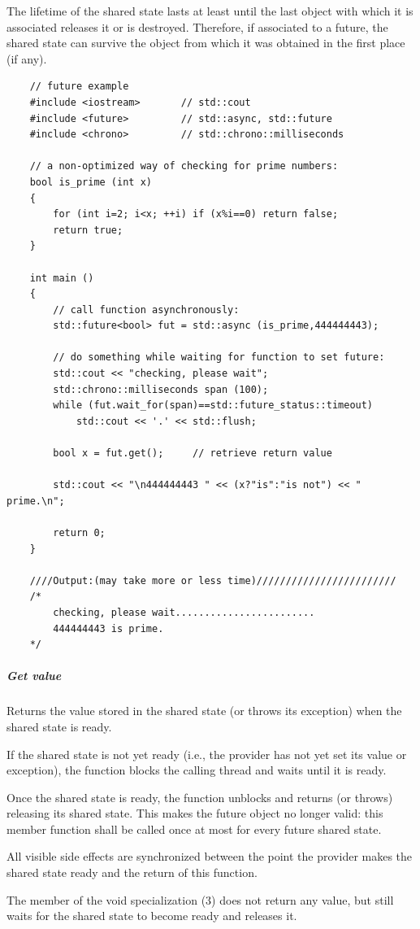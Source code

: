 \documentclass[UTF8,a4paper,12pt]{ctexbook}
\begin{document}
			The lifetime of the shared state lasts at least until the last object with which it is associated releases it or is destroyed. Therefore, if associated to a future, the shared state can survive the object from which it was obtained in the first place (if any).
\begin{lstlisting}
	// future example
	#include <iostream>       // std::cout
	#include <future>         // std::async, std::future
	#include <chrono>         // std::chrono::milliseconds
	
	// a non-optimized way of checking for prime numbers:
	bool is_prime (int x) 
	{
		for (int i=2; i<x; ++i) if (x%i==0) return false;
		return true;
	}
	
	int main ()
	{
		// call function asynchronously:
		std::future<bool> fut = std::async (is_prime,444444443); 
		
		// do something while waiting for function to set future:
		std::cout << "checking, please wait";
		std::chrono::milliseconds span (100);
		while (fut.wait_for(span)==std::future_status::timeout)
			std::cout << '.' << std::flush;
		
		bool x = fut.get();     // retrieve return value
		
		std::cout << "\n444444443 " << (x?"is":"is not") << " prime.\n";
		
		return 0;
	}
	
	////Output:(may take more or less time)////////////////////////
	/*
		checking, please wait........................
		444444443 is prime.
	*/
\end{lstlisting}
			\subparagraph{Get value}Returns the value stored in the shared state (or throws its exception) when the shared state is ready.
			
			If the shared state is not yet ready (i.e., the provider has not yet set its value or exception), the function blocks the calling thread and waits until it is ready.
			
			Once the shared state is ready, the function unblocks and returns (or throws) releasing its shared state. This makes the future object no longer valid: this member function shall be called once at most for every future shared state.
			
			All visible side effects are synchronized between the point the provider makes the shared state ready and the return of this function.
			
			The member of the void specialization (3) does not return any value, but still waits for the shared state to become ready and releases it.
			
\end{document}
